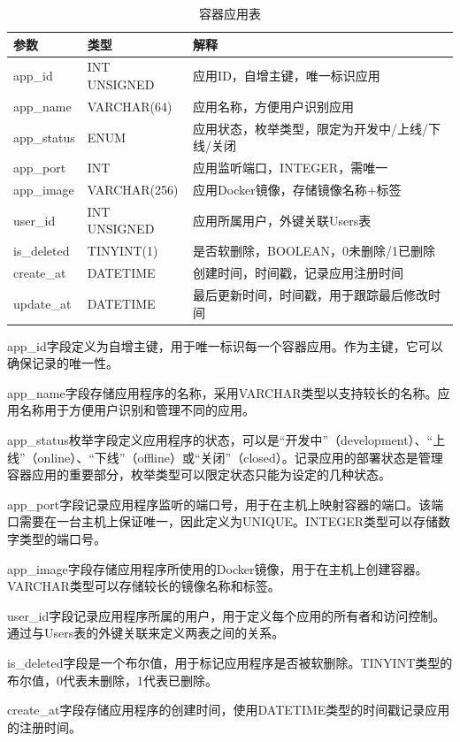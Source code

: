 \documentclass{HDU-Bachelor-Thesis}
\begin{document}
\begin{table}[htbp]
\caption{容器应用表}
\label{table:app}
\centering
\begin{tabular}{l|l|l}
\hline
\textbf{参数} & \textbf{类型} & \textbf{解释} \\ \hline
app\_id & INT UNSIGNED & 应用ID，自增主键，唯一标识应用 \\
app\_name & VARCHAR(64) & 应用名称，方便用户识别应用\\
app\_status & ENUM & 应用状态，枚举类型，限定为开发中/上线/下线/关闭\\
app\_port & INT & 应用监听端口，INTEGER，需唯一\\
app\_image & VARCHAR(256) & 应用Docker镜像，存储镜像名称+标签\\
user\_id & INT UNSIGNED & 应用所属用户，外键关联Users表\\
is\_deleted & TINYINT(1) & 是否软删除，BOOLEAN，0未删除/1已删除\\
create\_at & DATETIME & 创建时间，时间戳，记录应用注册时间\\
update\_at & DATETIME & 最后更新时间，时间戳，用于跟踪最后修改时间\\
\hline
\end{tabular}
\end{table}

app\_id字段定义为自增主键，用于唯一标识每一个容器应用。作为主键，它可以确保记录的唯一性。

app\_name字段存储应用程序的名称，采用VARCHAR类型以支持较长的名称。应用名称用于方便用户识别和管理不同的应用。

app\_status枚举字段定义应用程序的状态，可以是“开发中”（development）、“上线”（online）、“下线”（offline）或“关闭”（closed）。记录应用的部署状态是管理容器应用的重要部分，枚举类型可以限定状态只能为设定的几种状态。

app\_port字段记录应用程序监听的端口号，用于在主机上映射容器的端口。该端口需要在一台主机上保证唯一，因此定义为UNIQUE。INTEGER类型可以存储数字类型的端口号。

app\_image字段存储应用程序所使用的Docker镜像，用于在主机上创建容器。VARCHAR类型可以存储较长的镜像名称和标签。

user\_id字段记录应用程序所属的用户，用于定义每个应用的所有者和访问控制。通过与Users表的外键关联来定义两表之间的关系。

is\_deleted字段是一个布尔值，用于标记应用程序是否被软删除。TINYINT类型的布尔值，0代表未删除，1代表已删除。

create\_at字段存储应用程序的创建时间，使用DATETIME类型的时间戳记录应用的注册时间。
\end{document}
